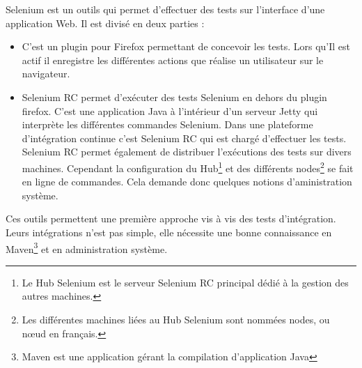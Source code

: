 Selenium est un outils qui permet d'effectuer des tests sur l'interface d'une application Web. Il 
est divisé en deux parties :
\begin{itemize}
	\item {}
		C'est un plugin pour Firefox permettant de concevoir les tests. Lors qu'Il est actif il enregistre
		les différentes actions que réalise un utilisateur sur le navigateur.
		
	\item {}
		Selenium RC permet d'exécuter des tests Selenium en dehors du plugin firefox. C'est une
		application Java à l'intérieur d'un serveur Jetty qui interprète les différentes commandes Selenium.
		Dans une plateforme d'intégration continue c'est Selenium RC qui est chargé d'effectuer les tests.
		Selenium RC permet également de distribuer l'exécutions des tests sur divers machines. Cependant
		la configuration du Hub\footnote{Le Hub Selenium est le serveur Selenium RC principal dédié à la gestion
		des autres machines.} et des différents nodes\footnote{Les différentes machines liées au Hub Selenium sont
		nommées nodes, ou nœud en français.} se fait en ligne de commandes. Cela demande donc quelques notions
		d'aministration système.
 		
\end{itemize}

Ces outils permettent une première approche vis à vis des tests d'intégration. Leurs intégrations n'est pas simple, elle nécessite une bonne connaissance en Maven\footnote{Maven est une application gérant la compilation d'application Java} et
en administration système. 

